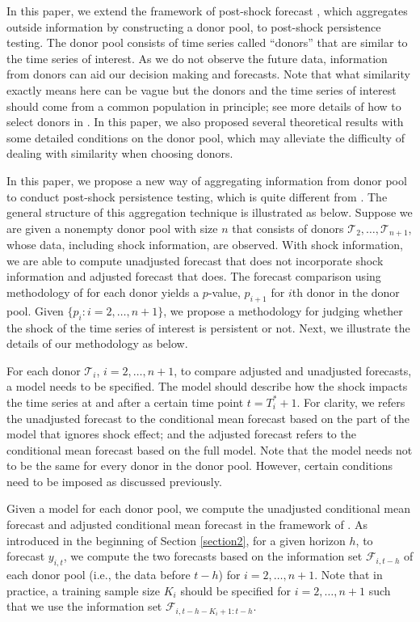 \documentclass[11pt]{article}
\def\mc#1{\mathcal{#1}} %
\def\mc#1{\mathcal{#1}}
\theoremstyle{definition}
\begin{document}
In this paper, we extend the framework of post-shock forecast \citep{lin2021minimizing}, which aggregates outside information by constructing a donor pool, to post-shock persistence testing. The donor pool consists of time series called  ``donors'' that are similar to the time series of interest. As we do not observe the future data, information from donors can aid our decision making and forecasts. Note that what  similarity exactly means here can be vague but the donors and the time series of interest should come from a common population in principle; see more details of how to select donors in \cite{lin2021minimizing}. In this paper, we also proposed several theoretical results with some detailed conditions on the donor pool, which may alleviate the difficulty of dealing with similarity when choosing donors.


In this paper, we propose a new way of aggregating information from donor pool to conduct post-shock persistence testing, which is quite different from \cite{lin2021minimizing}. The general structure of this aggregation technique is illustrated as below. Suppose we are given a nonempty donor pool with size $n$ that consists of donors $\mc{T}_2, \ldots, \mc{T}_{n+1}$, whose data, including shock information, are observed. With shock information, we are able to compute unadjusted forecast that does not incorporate shock information and adjusted forecast that does.  The forecast comparison using methodology of \cite{quaedvlieg2021multi} for each donor yields a $p$-value, $p_{i+1}$ for $i$th donor in the donor pool. Given $\{p_i \colon i = 2, \ldots, n+1\}$, we propose a methodology for judging whether the shock of the time series of interest is persistent or not. Next, we illustrate the details of our methodology as below.



For each donor $\mc{T}_i$, $i = 2, \ldots, n+1$, to compare adjusted and unadjusted forecasts,  a model needs to be specified. The model should describe how the shock impacts the time series at and after a certain time point $t= T_i^* + 1$. For clarity, we refers the unadjusted forecast to the conditional mean forecast based on the part of the model that ignores shock effect; and the adjusted forecast refers to the conditional mean forecast based on the full model. Note that the model needs not to be the same for every donor in the donor pool. However, certain conditions need to be imposed as discussed previously. 

 Given a model for each donor pool, we compute the unadjusted conditional mean forecast and adjusted conditional mean forecast in the framework of \cite{quaedvlieg2021multi}. As introduced in the beginning of Section \ref{section2}, for a given horizon $h$, to forecast $y_{i, t}$, we compute the two forecasts based on the information set $\mathcal{F}_{i, t-h}$ of each donor pool (i.e., the data before $t-h$) for $i = 2, \ldots, n+1$. Note that in practice, a training sample size $K_i$ should be specified for $i = 2, \ldots, n+1$ such that we use the information set $\mathcal{F}_{i, t-h-K_i + 1:t-h}$. 
 
\end{document}
